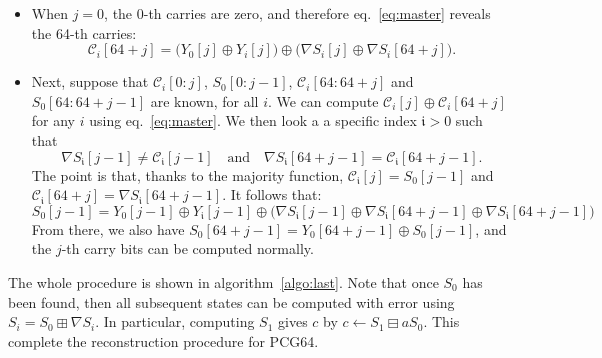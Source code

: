 \documentclass[journal=tosc,final]{iacrtrans}
\begin{document}
\begin{itemize}
\item When $j=0$, the $0$-th carries are zero, and therefore eq.~\eqref{eq:master}
reveals the 64-th carries:
\[
  \mathcal{C}_i[64+j] = \bigl( Y_0[j] \oplus Y_i[j] \bigr)  \oplus \bigl( \nabla S_i[j] \oplus \nabla S_i[64+j] \bigr).
\]

\item Next, suppose that $\mathcal{C}_i[0:j]$, $S_0[0:j-1]$, $\mathcal{C}_i[64:64+j]$
and $S_0[64:64+j-1]$ are known, for all $i$. We can compute
$\mathcal{C}_i[j] \oplus \mathcal{C}_i[64+j]$ for any $i$ using
eq.~\eqref{eq:master}. We then look a a specific index $\mathfrak{i} > 0$ such that
\[
   \nabla S_{\mathfrak{i}}[j-1] \neq \mathcal{C}_{\mathfrak{i}}[j-1] \quad \text{and} \quad \nabla S_{\mathfrak{i}}[64 + j-1] = \mathcal{C}_{\mathfrak{i}}[64 + j-1].
\]
The point is that, thanks to the majority function,
$\mathcal{C}_{\mathfrak{i}}[j] = S_0[j-1]$ and
$\mathcal{C}_{\mathfrak{i}}[64+j] = \nabla S_{\mathfrak{i}}[64 + j-1]$. It follows
that:
\[
  S_0[j-1] = Y_0[j-1] \oplus Y_{\mathfrak{i}}[j-1] \oplus \bigl( \nabla S_{\mathfrak{i}}[j-1] \oplus \nabla S_{\mathfrak{i}}[64+j-1] \oplus \nabla S_{\mathfrak{i}}[64 + j-1]\bigr)
\]
From there, we also have $S_0[64+j-1] = Y_0[64+j-1] \oplus S_0[j-1]$, and the
$j$-th carry bits can be computed normally.
\end{itemize}

The whole procedure is shown in algorithm~\ref{algo:last}. Note that once $S_0$
has been found, then all subsequent states can be computed with error using
$S_i = S_0 \boxplus \nabla S_i$. In particular, computing $S_1$ gives $c$ by
$c \gets S_1 \boxminus a S_0$. This complete the reconstruction procedure for
\textsf{PCG64}.
\end{document}
